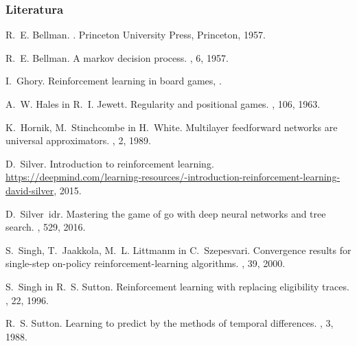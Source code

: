 \documentclass{beamer}    %
\begin{document}
\begin{frame}[t, allowframebreaks]
    \frametitle{Literatura}
    \nocite{*}
    \fontsize{6pt}{0pt}
    \begin{thebibliography}{10}

        R.~E. Bellman.
        .
        \newblock Princeton University Press, Princeton, 1957.
        
        R.~E. Bellman.
        \newblock A markov decision process.
        , 6, 1957.
        
        I.~Ghory.
        \newblock Reinforcement learning in board games,
        .
        
        A.~W. Hales in R.~I. Jewett.
        \newblock Regularity and positional games.
        , 106, 1963.
        
        K.~Hornik, M.~Stinchcombe in H.~White.
        \newblock Multilayer feedforward networks are universal approximators.
        , 2, 1989.
        
        D.~Silver.
        \newblock Introduction to reinforcement learning.
        \newblock
          \url{https://deepmind.com/learning-resources/-introduction-reinforcement-learning-david-silver},
          2015.
        
        D.~Silver~idr.
        \newblock Mastering the game of go with deep neural networks and tree search.
        , 529, 2016.
        
        S.~Singh, T.~Jaakkola, M.~L. Littmanm in C.~Szepesvari.
        \newblock Convergence results for single-step on-policy reinforcement-learning
          algorithms.
        , 39, 2000.
        
        S.~Singh in R.~S. Sutton.
        \newblock Reinforcement learning with replacing eligibility traces.
        , 22, 1996.
        
        R.~S. Sutton.
        \newblock Learning to predict by the methods of temporal differences.
        , 3, 1988.
        

\end{thebibliography}
\end{frame}
\end{document}
